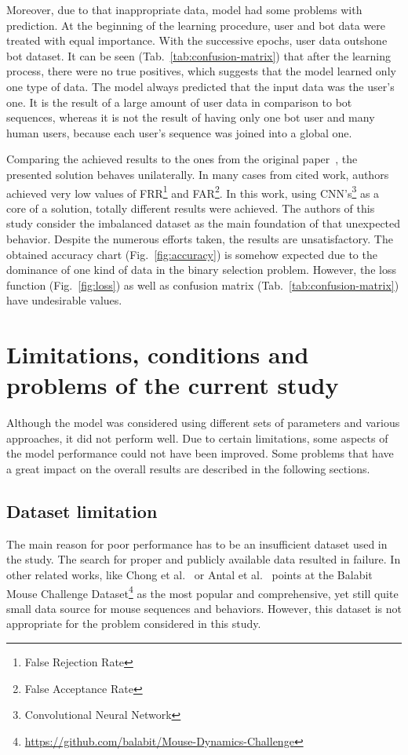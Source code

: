 Moreover, due to that inappropriate data, model had some problems with prediction.
At the beginning of the learning procedure, user and bot data were treated with equal importance.
With the successive epochs, user data outshone bot dataset.
It can be seen \mbox{(Tab.~\ref{tab:confusion-matrix})} that after the learning process, there were no true positives, which suggests that the model learned only one type of data.
The model always predicted that the input data was the user's one.
It is the result of a large amount of user data in comparison to bot sequences, whereas it is not the result of having only one bot user and many human users, because each user's sequence was joined into a global one.

Comparing the achieved results to the ones from the original paper~\cite{Main}, the presented solution behaves unilaterally.
In many cases from cited work, authors achieved very low values of FRR\footnote{False Rejection Rate} and FAR\footnote{False Acceptance Rate}\@.
In this work, using CNN's\footnote{Convolutional Neural Network} as a core of a solution, totally different results were achieved.
The authors of this study consider the imbalanced dataset as the main foundation of that unexpected behavior.
Despite the numerous efforts taken, the results are unsatisfactory.
The obtained accuracy chart (Fig.~\ref{fig:accuracy}) is somehow expected due to the dominance of one kind of data in the binary selection problem.
However, the loss function (Fig.~\ref{fig:loss}) as well as confusion matrix (Tab.~\ref{tab:confusion-matrix}) have undesirable values.


\section{Limitations, conditions and problems of the current study}\label{sec:limitations-conditions-problems}
Although the model was considered using different sets of parameters and various approaches, it did not perform well.
Due to certain limitations, some aspects of the model performance could not have been improved.
Some problems that have a great impact on the overall results are described in the following sections.

\subsection{Dataset limitation}\label{subsec:dataset-limitation}
The main reason for poor performance has to be an insufficient dataset used in the study.
The search for proper and publicly available data resulted in failure.
In other related works, like Chong et al.~\cite{Main} or Antal et al.~\cite{balabit1} points at the Balabit Mouse Challenge Dataset\footnote{\url{https://github.com/balabit/Mouse-Dynamics-Challenge}} as the most popular and comprehensive, yet still quite small data source for mouse sequences and behaviors.
However, this dataset is not appropriate for the problem considered in this study.

